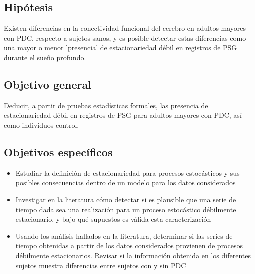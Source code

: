 \documentclass[12pt,a4paper]{mitthesis}
\begin{document}

\subsection{Hip\'otesis}

Existen diferencias en la conectividad funcional del cerebro en adultos mayores con PDC, respecto
a sujetos sanos, y es posible detectar estas diferencias como una mayor o menor 'presencia' de 
estacionariedad d\'ebil en registros de PSG durante el sue\~no profundo.


\subsection{Objetivo general}

Deducir, a partir de pruebas estad\'isticas formales, las presencia de estacionariedad d\'ebil en
registros de PSG para adultos mayores con PDC, as\'i como individuos control.


\subsection{Objetivos espec\'ificos}

\begin{itemize}
\item Estudiar la definici\'on de estacionariedad para procesos estoc\'asticos y sus posibles 
consecuencias dentro de un modelo para los datos considerados

\item Investigar en la literatura c\'omo detectar si es plausible que una serie de tiempo dada sea 
una realizaci\'on para un proceso estoc\'astico d\'ebilmente estacionario, y bajo qu\'e supuestos 
es v\'alida esta caracterizaci\'on

\item Usando los an\'alisis hallados en la literatura, determinar si las series de tiempo 
obtenidas a partir de los datos considerados provienen de procesos d\'ebilmente estacionarios.
Revisar si la informaci\'on obtenida en los diferentes sujetos muestra diferencias entre sujetos 
con y sin PDC
\end{itemize}
\end{document}
